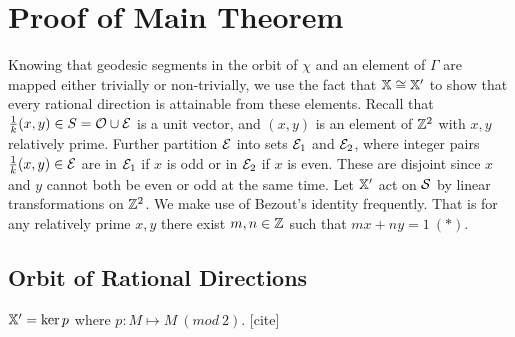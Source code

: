 \documentclass[]{article}
\begin{document}
\section{Proof of Main Theorem}
Knowing that geodesic segments in the orbit of $\chi$ and an element of $\Gamma$ are mapped either trivially or non-trivially, we use the fact that $\mathbb{X}\cong\mathbb{X}'$ to show that every rational direction is attainable from these elements. Recall that $\frac{1}{k}(x,y)\in S=\mathcal{O}\cup \mathcal{E}$ is a unit vector, and $(x,y)$ is an element of $\mathbb{Z}^2$ with $x,y$ relatively prime. Further partition $\mathcal{E}$ into sets $\mathcal{E}_1$ and $\mathcal{E}_2$, where integer pairs $\frac{1}{k}(x,y)\in\mathcal{E}$ are in $\mathcal{E}_1$ if $x$ is odd or in $\mathcal{E}_2$ if $x$ is even. These are disjoint since $x$ and $y$ cannot both be even or odd at the same time. Let $\mathbb{X}'$ act on $\mathcal{S}$ by linear transformations on $\mathbb{Z}^2$. We make use of Bezout's identity frequently. That is for any relatively prime $x,y$ there exist $m,n\in\mathbb{Z}$ such that $mx+ny=1~(*)$.

\subsection{Orbit of Rational Directions}

\begin{lem}
$\mathbb{X}'=\ker p$ where $p:M\mapsto M~(mod~2)$. [cite]
\end{lem}
\end{document}
